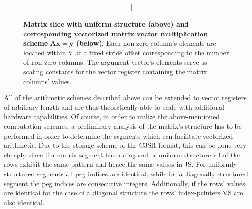 \begin{figure}[ht]
$$\begin{matrix}
\begin{bmatrix}
                                                                                     \end{bmatrix}
        \end{matrix}
        $$
        \caption[Matrix slice with uniform structure and corresponding vectorized matrix-vector-multiplication scheme.]{\textbf{Matrix slice with uniform structure (above) and corresponding vectorized matrix-vector-multiplication scheme $\bm{Ax=y}$ (below).} Each non-zero column's elements are located within V at a fixed stride offset corresponding to the number of non-zero columns. The argument vector's elements serve as scaling constants for the vector register containing the matrix columns' values.}
        \label{fig:simd_scheme_uniform}
      \end{figure}

      All of the arithmetic schemes described above can be extended to vector registers of arbitrary length and are thus theoretically able to scale with additional hardware capabilities. Of course, in order to utilize the above-mentioned computation schemes, a preliminary analysis of the matrix's structure has to be performed in order to determine the segments which can facilitate vectorized arithmetic. Due to the storage scheme of the C3SR format, this can be done very cheaply since if a matrix segment has a diagonal or uniform structure all of the rows exhibit the same pattern and hence the same values in JS. For uniformly structured segments all peg indices are identical, while for a diagonally structured segment the peg indices are consecutive integers. Additionally, if the rows' values are identical for the case of a diagonal structure the rows' index-pointers VS are also identical.


